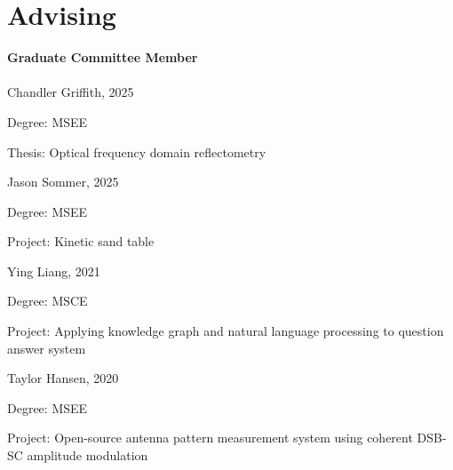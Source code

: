 \section{\sc Advising}
%
\textbf{Graduate Committee Member}\\
\\
Chandler Griffith, 2025
\begin{list2}
    \item Degree:  MSEE
    \item Thesis:  Optical frequency domain reflectometry
\end{list2}

Jason Sommer, 2025
\begin{list2}
    \item Degree:  MSEE
    \item Project:  Kinetic sand table
\end{list2}

Ying Liang, 2021
\begin{list2}
    \item Degree:  MSCE
    \item Project:  Applying knowledge graph and natural language processing to question answer system
\end{list2}

Taylor Hansen, 2020
\begin{list2}
    \item Degree:  MSEE
    \item Project:  Open-source antenna pattern measurement system using coherent DSB-SC amplitude modulation
\end{list2}

